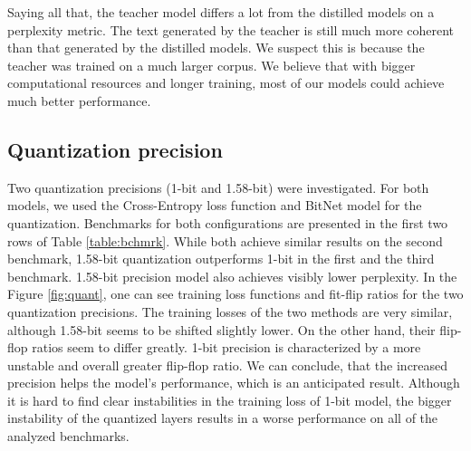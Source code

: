 \documentclass{article}
\begin{document}
Saying all that, the teacher model differs a lot from the distilled models on a perplexity metric. The text generated by the teacher is still much more coherent than that generated by the distilled models. We suspect this is because the teacher was trained on a much larger corpus. We believe that with bigger computational resources and longer training, most of our models could achieve much better performance.

\subsection{Quantization precision}
Two quantization precisions (1-bit and 1.58-bit) were investigated. For both models, we used the Cross-Entropy loss function and BitNet model for the quantization. Benchmarks for both configurations are presented in the first two rows of Table \ref{table:bchmrk}. While both achieve similar results on the second benchmark, 1.58-bit quantization outperforms 1-bit in the first and the third benchmark. 1.58-bit precision model also achieves visibly lower perplexity. In the Figure \ref{fig:quant}, one can see training loss functions and fit-flip ratios for the two quantization precisions. The training losses of the two methods are very similar, although 1.58-bit seems to be shifted slightly lower. On the other hand, their flip-flop ratios seem to differ greatly. 1-bit precision is characterized by a more unstable and overall greater flip-flop ratio. We can conclude, that the increased precision helps the model's performance, which is an anticipated result. Although it is hard to find clear instabilities in the training loss of 1-bit model, the bigger instability of the quantized layers results in a worse performance on all of the analyzed benchmarks.
\end{document}
